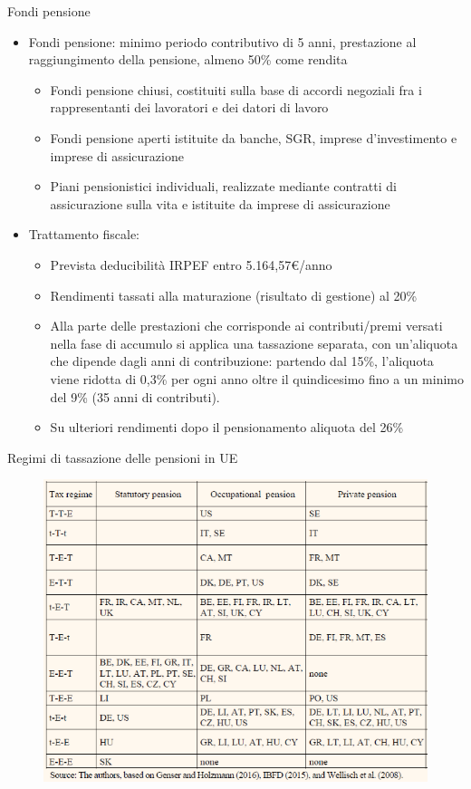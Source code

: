 \documentclass[aspectratio=64,11pt]{beamer}
\begin{document}
\begin{frame}{Fondi pensione}
\begin{itemize}
\item Fondi pensione: minimo periodo contributivo di 5 anni, prestazione al
raggiungimento della pensione, almeno 50\% come rendita
\begin{itemize}
\item \alert{Fondi pensione chiusi}, costituiti sulla base di accordi negoziali fra i rappresentanti dei lavoratori e dei datori di lavoro
\item \alert{Fondi pensione aperti} istituite da banche, SGR, imprese d’investimento e imprese di assicurazione
\item \alert{Piani pensionistici individuali}, realizzate mediante contratti di assicurazione sulla vita e istituite da imprese di assicurazione
\end{itemize}
\item Trattamento fiscale:
\begin{itemize}
\item Prevista deducibilità IRPEF entro 5.164,57€/anno
\item Rendimenti tassati alla maturazione (risultato di gestione) al 20\%
\item Alla parte delle prestazioni che corrisponde ai contributi/premi versati
nella fase di accumulo si applica una tassazione separata, con un’aliquota
che dipende dagli anni di contribuzione: partendo dal 15\%, l’aliquota
viene ridotta di 0,3\% per ogni anno oltre il quindicesimo fino a un minimo
del 9\% (35 anni di contributi).
\item Su ulteriori rendimenti dopo il pensionamento aliquota del 26\%
\end{itemize}
\end{itemize}
\end{frame}

\begin{frame}{Regimi di tassazione delle pensioni in UE}
\begin{figure}
\includegraphics[width=.75\textwidth]{./figure/regimi-tassazione-pensioni.png}
\end{figure}
\end{frame}
\end{document}
